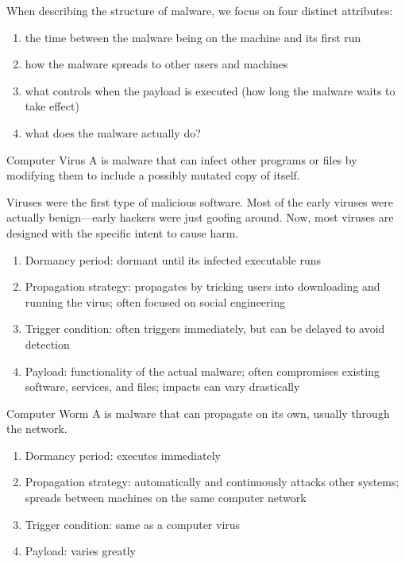 When describing the structure of malware, we focus on four distinct attributes:
\begin{enumerate}[noitemsep]
    \item {} the time between the malware being on the machine and its first run
    \item {} how the malware spreads to other users and machines
    \item {} what controls when the payload is executed (how long the malware waits to take effect)
    \item {} what does the malware actually do?
\end{enumerate}

\begin{dfnbox}{Computer Virus}{}
    A  is malware that can infect other programs or files by modifying them to include a possibly mutated copy of itself.
\end{dfnbox}

Viruses were the first type of malicious software. Most of the early viruses were actually benign---early hackers were just goofing around. Now, most viruses are designed with the specific intent to cause harm.

\begin{enumerate}[noitemsep]
    \item Dormancy period: dormant until its infected executable runs
    \item Propagation strategy: propagates by tricking users into downloading and running the virus; often focused on social engineering
    \item Trigger condition: often triggers immediately, but can be delayed to avoid detection
    \item Payload: functionality of the actual malware; often compromises existing software, services, and files; impacts can vary drastically
\end{enumerate}

\begin{dfnbox}{Computer Worm}{}
    A  is malware that can propagate on its own, usually through the network.
\end{dfnbox}

\begin{enumerate}
    \item Dormancy period: executes immediately
    \item Propagation strategy: automatically and continuously attacks other systems; spreads between machines on the same computer network
    \item Trigger condition: same as a computer virus
    \item Payload: varies greatly
\end{enumerate}

